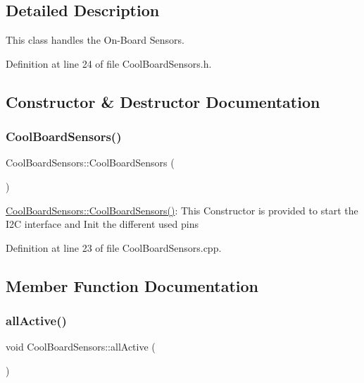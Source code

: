 \subsection{Detailed Description}
This class handles the On-\/\+Board Sensors. 

Definition at line 24 of file Cool\+Board\+Sensors.\+h.



\subsection{Constructor \& Destructor Documentation}
\mbox{\label{class_cool_board_sensors_a91ff2a02f5486f90cf2413a1cf8a9ed4}} 
\subsubsection{\texorpdfstring{Cool\+Board\+Sensors()}{CoolBoardSensors()}}
{\footnotesize\ttfamily Cool\+Board\+Sensors\+::\+Cool\+Board\+Sensors (\begin{DoxyParamCaption}{ }\end{DoxyParamCaption})}

\hyperlink{class_cool_board_sensors_a91ff2a02f5486f90cf2413a1cf8a9ed4}{Cool\+Board\+Sensors\+::\+Cool\+Board\+Sensors()}\+: This Constructor is provided to start the I2C interface and Init the different used pins 

Definition at line 23 of file Cool\+Board\+Sensors.\+cpp.



\subsection{Member Function Documentation}
\mbox{\label{class_cool_board_sensors_aa432c5aac88f89c31a10766390f23e0b}} 
\subsubsection{\texorpdfstring{all\+Active()}{allActive()}}
{\footnotesize\ttfamily void Cool\+Board\+Sensors\+::all\+Active (\begin{DoxyParamCaption}{ }\end{DoxyParamCaption})}

